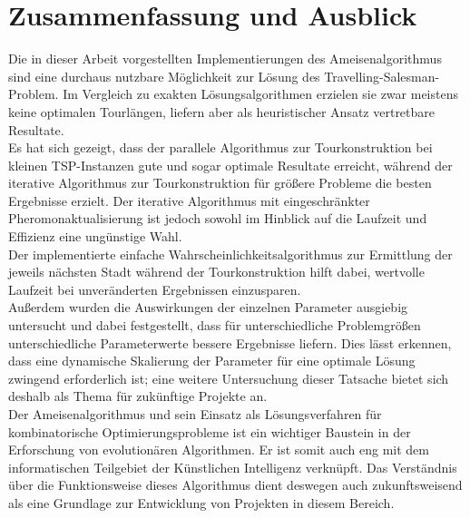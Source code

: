 \documentclass[doktyp=barbeit, sprache=german]{TUBAFarbeiten}
\begin{document}
\section{Zusammenfassung und Ausblick}
Die in dieser Arbeit vorgestellten Implementierungen des Ameisenalgorithmus sind eine durchaus nutzbare Möglichkeit zur Lösung des Travelling-Salesman-Problem. Im Vergleich zu exakten Lösungsalgorithmen erzielen sie zwar meistens keine optimalen Tourlängen, liefern aber als heuristischer Ansatz vertretbare Resultate.
\\Es hat sich gezeigt, dass der parallele Algorithmus zur Tourkonstruktion bei kleinen TSP-Instanzen gute und sogar optimale Resultate erreicht, während der iterative Algorithmus zur Tourkonstruktion für größere Probleme die besten Ergebnisse erzielt. Der iterative Algorithmus mit eingeschränkter Pheromonaktualisierung ist jedoch sowohl im Hinblick auf die Laufzeit und Effizienz eine ungünstige Wahl.
\\Der implementierte einfache Wahrscheinlichkeitsalgorithmus zur Ermittlung der jeweils nächsten Stadt während der Tourkonstruktion hilft dabei, wertvolle Laufzeit bei unveränderten Ergebnissen einzusparen.
\\Außerdem wurden die Auswirkungen der einzelnen Parameter ausgiebig untersucht und dabei festgestellt, dass für unterschiedliche Problemgrößen unterschiedliche Parameterwerte bessere Ergebnisse liefern.
Dies lässt erkennen, dass eine dynamische Skalierung der Parameter für eine optimale Lösung zwingend erforderlich ist; eine weitere Untersuchung dieser Tatsache bietet sich deshalb als Thema für zukünftige Projekte an.
\\Der Ameisenalgorithmus und sein Einsatz als Lösungsverfahren für kombinatorische Optimierungsprobleme ist ein wichtiger Baustein in der Erforschung von evolutionären Algorithmen.  Er ist somit auch eng mit dem informatischen Teilgebiet der Künstlichen Intelligenz verknüpft. Das Verständnis über die Funktionsweise dieses Algorithmus dient deswegen auch zukunftsweisend als eine Grundlage zur Entwicklung von Projekten in diesem Bereich.
\newpage
\appendix
\end{document}
